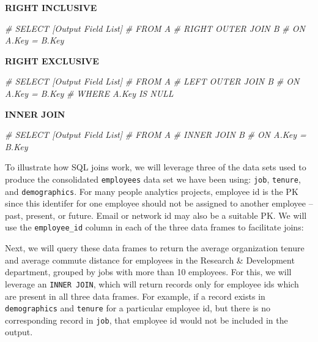\documentclass[]{book}
\newenvironment{Shaded}{\begin{snugshade}}{\end{snugshade}}
\newcommand{\CommentTok}[1]{\textcolor[rgb]{0.56,0.35,0.01}{\textit{#1}}}
\begin{document}
\textbf{RIGHT INCLUSIVE}

\begin{Shaded}
\begin{Highlighting}[]
\CommentTok{#  SELECT [Output Field List]}
\CommentTok{#  FROM A }
\CommentTok{#  RIGHT OUTER JOIN B}
\CommentTok{#  ON A.Key = B.Key}
\end{Highlighting}
\end{Shaded}

\textbf{RIGHT EXCLUSIVE}

\begin{Shaded}
\begin{Highlighting}[]
\CommentTok{#  SELECT [Output Field List]}
\CommentTok{#  FROM A }
\CommentTok{#  LEFT OUTER JOIN B}
\CommentTok{#  ON A.Key = B.Key}
\CommentTok{#  WHERE A.Key IS NULL}
\end{Highlighting}
\end{Shaded}

\textbf{INNER JOIN}

\begin{Shaded}
\begin{Highlighting}[]
\CommentTok{#  SELECT [Output Field List]}
\CommentTok{#  FROM A }
\CommentTok{#  INNER JOIN B}
\CommentTok{#  ON A.Key = B.Key}
\end{Highlighting}
\end{Shaded}

To illustrate how SQL joins work, we will leverage three of the data sets used to produce the consolidated \texttt{employees} data set we have been using: \texttt{job}, \texttt{tenure}, and \texttt{demographics}. For many people analytics projects, employee id is the PK since this identifer for one employee should not be assigned to another employee -- past, present, or future. Email or network id may also be a suitable PK. We will use the \texttt{employee\_id} column in each of the three data frames to facilitate joins:

Next, we will query these data frames to return the average organization tenure and average commute distance for employees in the Research \& Development department, grouped by jobs with more than 10 employees. For this, we will leverage an \texttt{INNER\ JOIN}, which will return records only for employee ids which are present in all three data frames. For example, if a record exists in \texttt{demographics} and \texttt{tenure} for a particular employee id, but there is no corresponding record in \texttt{job}, that employee id would not be included in the output.
\end{document}
